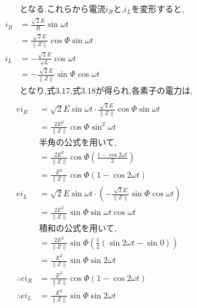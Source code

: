 \documentclass[twocolumn]{article}
\begin{document}
\begin{enumerate}
\begin{align*}
      &\text{となる.これらから電流}i_R\text{と,}i_L\text{を変形すると,}\\
      i_R   &= \frac{\sqrt{2}E}{R}\sin \omega t\\
            &= \frac{\sqrt{2}E}{\|Z\|}\cos \Phi \sin \omega t\\
      i_L   &= -\frac{\sqrt{2}E}{\omega L} \cos \omega t\\
            &= -\frac{\sqrt{2}E}{\|Z\|} \sin \Phi \cos \omega t\\
      &\text{となり,式3.17,式3.18が得られ,各素子の電力は,}\\
    \end{align*}
    \begin{align*}
      ei_R  &= \sqrt{2}E\sin\omega t \cdot \frac{\sqrt{2}E}{\|Z\|}\cos\Phi\sin\omega t\\
            &= \frac{2E^2}{\|Z\|}\cos\Phi\sin^2\omega t\\
      &\text{半角の公式を用いて,}\\
            &= \frac{2E^2}{\|Z\|}\cos\Phi\left(\frac{1 - \cos 2\omega t}{2}\right)\\
            &= \frac{E^2}{\|Z\|}\cos\Phi\left(1 - \cos 2\omega t\right)\\
      ei_L  &= \sqrt{2}E\sin\omega t \cdot \left(-\frac{\sqrt{2}E}{\|Z\|} \sin \Phi \cos \omega t \right)\\
            &= \frac{2E^2}{\|Z\|} \sin\Phi \sin\omega t\cos\omega t \\
      &\text{積和の公式を用いて,}\\
      &= \frac{2E^2}{\|Z\|}\sin\Phi \left( \frac{1}{2} \left(\sin 2\omega t - \sin 0 \right) \right)\\
      &= \frac{E^2}{\|Z\|}\sin\Phi\sin 2\omega t\\
      \therefore ei_R  &= \frac{E^2}{\|Z\|}\cos\Phi\left(1 - \cos 2\omega t\right)\\
      \therefore ei_L  &= \frac{E^2}{\|Z\|}\sin\Phi\sin 2\omega t\\
    \end{align*}


\end{enumerate}
\end{document}
